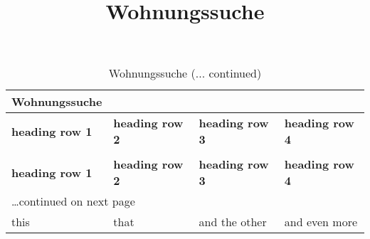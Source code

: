 \documentclass[a4paper]{article}
\begin{document}
\title{Wohnungssuche%
  \label{wohnungssuche}}
\author{}
\date{}
\maketitle


\begin{longtable}[l]{|l|l|l|l|}
\caption*{Wohnungssuche}\\
\hline
\textbf{heading row 1} & \textbf{heading row 2} & \textbf{heading row 3} & \textbf{heading row 4} \\
\hline
\endfirsthead
\caption*[]{Wohnungssuche (... continued)}\\
\hline
\textbf{heading row 1} & \textbf{heading row 2} & \textbf{heading row 3} & \textbf{heading row 4} \\
\hline
\endhead
\multicolumn{4}{l}{\raggedleft\ldots continued on next page}\\
\endfoot
\endlastfoot
this & that & and the other & and even more \\
\hline
\end{longtable}
\end{document}
